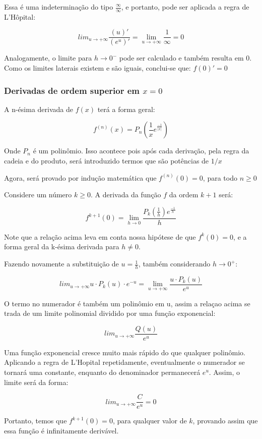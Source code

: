Essa é uma indeterminação do tipo $\frac{\infty}{\infty}$, e portanto, pode ser aplicada a regra de
L'Hôpital:

\[lim_{u\to+\infty} \frac{(u)'}{(e^u)'} = \lim_{u\to+\infty} \frac{1}{\infty} = 0\]

Analogamente, o limite para $h\to0^-$ pode ser calculado e também resulta em 0. Como os limites
laterais existem e são iguais, conclui-se que: $f(0)' = 0$

\subsubsection{Derivadas de ordem superior em $x = 0$}

A n-ésima derivada de $f(x)$ terá a forma geral:

\[f^{(n)}(x) = P_n(\frac{1}{x}e^{\frac{-1}{|x|}})\]

Onde $P_n$ é um polinômio. Isso acontece pois após cada derivação, pela regra da
cadeia e do produto, será introduzido termos que são potências de $1/x$

Agora, será provado por indução matemática que $f^{(n)}(0) = 0$, para todo $n \geq 0$

Considere um número $k \geq 0$. A derivada da função $f$ da ordem $k + 1$ será:

\[f^{k + 1}(0) = \lim_{h\to0} \frac{P_k (\frac{1}{h})e^{\frac{-1}{h}}}{h}\]

Note que a relação acima leva em conta nossa hipótese de que $f^k(0) = 0$, e a forma geral da k-ésima
derivada para $h\neq0$.

Fazendo novamente a substituição de $u = \frac{1}{h}$, também considerando $h\to0^+$:

\[lim_{u\to+\infty} u\cdot P_k(u)\cdot e^{-u} = \lim_{u\to+\infty} \frac{u \cdot P_k(u)}{e^u}\]

O termo no numerador é também um polinômio em u, assim a relaçao acima se trada de um limite polinomial
dividido por uma função exponencial:

\[lim_{u\to+\infty} \frac{Q(u)}{e^u}\]

Uma função exponencial cresce muito mais rápido do que qualquer polinômio. Aplicando a regra de L'Hopital
repetidamente, eventualmente o numerador se tornará uma constante, enquanto do denominador permanecerá
$e^u$. Assim, o limite será da forma:

\[lim_{u\to+\infty} \frac{C}{e^u} = 0\]

Portanto, temos que $f^{k+1}(0) = 0$, para qualquer valor de $k$, provando assim que essa função é 
infinitamente derivável.
